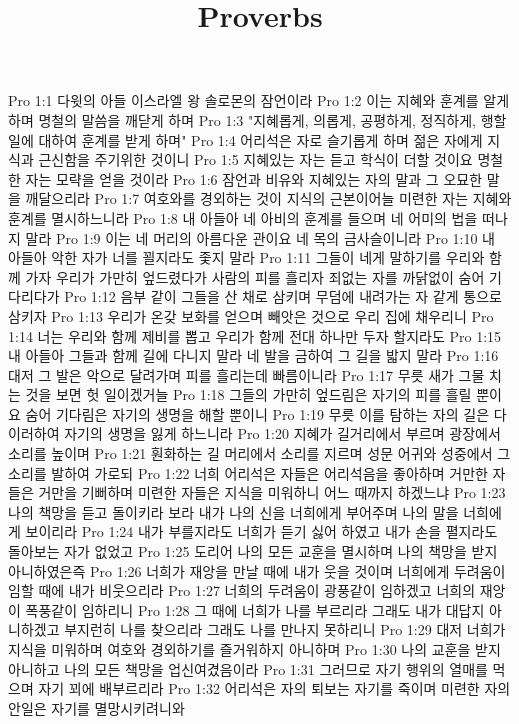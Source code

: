 

\title{Proverbs}

Pro 1:1  다윗의 아들 이스라엘 왕 솔로몬의 잠언이라
Pro 1:2  이는 지혜와 훈계를 알게 하며 명철의 말씀을 깨닫게 하며
Pro 1:3  "지혜롭게, 의롭게, 공평하게, 정직하게, 행할일에 대하여 훈계를 받게 하며"
Pro 1:4  어리석은 자로 슬기롭게 하며 젊은 자에게 지식과 근신함을 주기위한 것이니
Pro 1:5  지혜있는 자는 듣고 학식이 더할 것이요 명철한 자는 모략을 얻을 것이라
Pro 1:6  잠언과 비유와 지혜있는 자의 말과 그 오묘한 말을 깨달으리라
Pro 1:7  여호와를 경외하는 것이 지식의 근본이어늘 미련한 자는 지혜와 훈계를 멸시하느니라
Pro 1:8  내 아들아 네 아비의 훈계를 들으며 네 어미의 법을 떠나지 말라
Pro 1:9  이는 네 머리의 아름다운 관이요 네 목의 금사슬이니라
Pro 1:10  내 아들아 악한 자가 너를 꾈지라도 좇지 말라
Pro 1:11  그들이 네게 말하기를 우리와 함께 가자 우리가 가만히 엎드렸다가 사람의 피를 흘리자 죄없는 자를 까닭없이 숨어 기다리다가
Pro 1:12  음부 같이 그들을 산 채로 삼키며 무덤에 내려가는 자 같게 통으로 삼키자
Pro 1:13  우리가 온갖 보화를 얻으며 빼앗은 것으로 우리 집에 채우리니
Pro 1:14  너는 우리와 함께 제비를 뽑고 우리가 함께 전대 하나만 두자 할지라도
Pro 1:15  내 아들아 그들과 함께 길에 다니지 말라 네 발을 금하여 그 길을 밟지 말라
Pro 1:16  대저 그 발은 악으로 달려가며 피를 흘리는데 빠름이니라
Pro 1:17  무릇 새가 그물 치는 것을 보면 헛 일이겠거늘
Pro 1:18  그들의 가만히 엎드림은 자기의 피를 흘릴 뿐이요 숨어 기다림은 자기의 생명을 해할 뿐이니
Pro 1:19  무릇 이를 탐하는 자의 길은 다 이러하여 자기의 생명을 잃게 하느니라
Pro 1:20  지혜가 길거리에서 부르며 광장에서 소리를 높이며
Pro 1:21  훤화하는 길 머리에서 소리를 지르며 성문 어귀와 성중에서 그 소리를 발하여 가로되
Pro 1:22  너희 어리석은 자들은 어리석음을 좋아하며 거만한 자들은 거만을 기뻐하며 미련한 자들은 지식을 미워하니 어느 때까지 하겠느냐
Pro 1:23  나의 책망을 듣고 돌이키라 보라 내가 나의 신을 너희에게 부어주며 나의 말을 너희에게 보이리라
Pro 1:24  내가 부를지라도 너희가 듣기 싫어 하였고 내가 손을 펼지라도 돌아보는 자가 없었고
Pro 1:25  도리어 나의 모든 교훈을 멸시하며 나의 책망을 받지 아니하였은즉
Pro 1:26  너희가 재앙을 만날 때에 내가 웃을 것이며 너희에게 두려움이 임할 때에 내가 비웃으리라
Pro 1:27  너희의 두려움이 광풍같이 임하겠고 너희의 재앙이 폭풍같이 임하리니
Pro 1:28  그 때에 너희가 나를 부르리라 그래도 내가 대답지 아니하겠고 부지런히 나를 찾으리라 그래도 나를 만나지 못하리니
Pro 1:29  대저 너희가 지식을 미워하며 여호와 경외하기를 즐거워하지 아니하며
Pro 1:30  나의 교훈을 받지 아니하고 나의 모든 책망을 업신여겼음이라
Pro 1:31  그러므로 자기 행위의 열매를 먹으며 자기 꾀에 배부르리라
Pro 1:32  어리석은 자의 퇴보는 자기를 죽이며 미련한 자의 안일은 자기를 멸망시키려니와
